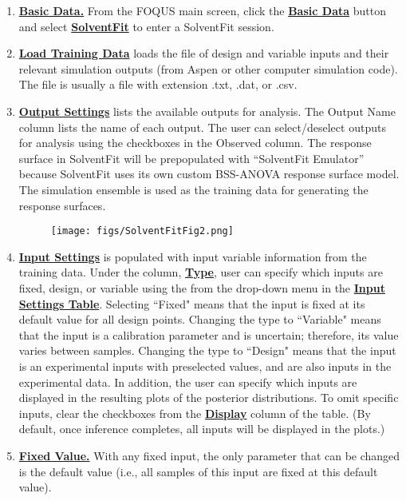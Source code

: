 \documentclass[12pt]{article}
\newcommand{\bu}[1] {\textbf{ \underline{#1}}}
\begin{document}
\begin{enumerate}

\item \bu{Basic Data.}  From the FOQUS main screen, click the \bu{Basic Data} button and select \bu{SolventFit} to enter a SolventFit session.

\item \bu{Load Training Data} loads the file of design and variable inputs and their relevant simulation outputs (from Aspen or other computer simulation code).  The file is usually a file with extension .txt, .dat, or .csv.

\item \bu{Output Settings} lists the available outputs for analysis.  The Output Name column lists the name of each output.  The user can select/deselect outputs for analysis using the checkboxes in the Observed column.  The response surface in SolventFit will be prepopulated with ``SolventFit Emulator'' because SolventFit uses its own custom BSS-ANOVA response surface model.  The simulation ensemble is used as the training data for generating the response surfaces.

\begin{figure}[h!]
\centering \texttt{[image: figs/SolventFitFig2.png]}
\label{fig:SolventFit_Fig_2}
\end{figure}

\item  \bu{Input Settings} is populated with input variable information from the training data.  Under the column, \bu{Type}, user can specify which inputs are fixed, design, or variable using the from the drop-down menu in the \bu{Input Settings Table}.  Selecting ``Fixed" means that the input is fixed at its default value for all design points. Changing the type to ``Variable" means that the input is a calibration parameter and is uncertain; therefore, its value varies between samples.   Changing the type to ``Design" means that the input is an experimental inputs with preselected values, and are also inputs in the experimental data.  In addition, the user can specify which inputs are displayed in the resulting plots of the posterior distributions.  To omit specific inputs, clear the checkboxes from the \textbf{\underline{Display}} column of the table.  (By default, once inference completes, all inputs will be
displayed in the plots.)   

\item \bu{Fixed Value.} With any fixed input, the only parameter that can be changed is the default value (i.e., all samples of this input are fixed at this default value). 


\end{enumerate}
\end{document}

